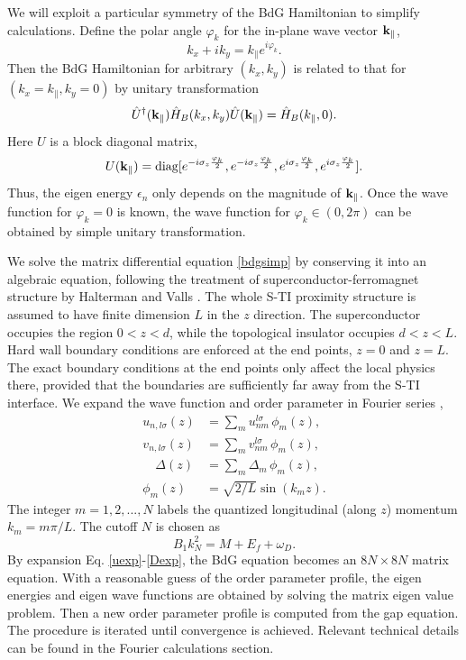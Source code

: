We will exploit a particular symmetry of the BdG Hamiltonian to simplify 
calculations. Define the polar angle $\varphi_k$ for the in-plane wave vector $\mathbf{k}_\parallel$, 
\begin{equation}
k_x+ik_y=k_{\parallel}e^{i\varphi_k}.
\end{equation}
Then the BdG Hamiltonian for arbitrary $(k_x,k_y)$ is
related to that for $(k_x=k_\parallel,k_y=0)$ by unitary transformation 
\begin{equation}
\hat{U}^\dagger(\mathbf{k}_\parallel) \hat{H}_{B}(k_x,k_y) \hat{U}(\mathbf{k}_\parallel) = \hat{H}_{B}(k_\parallel,0).
\label{symm}
\end{equation}
Here $U$ is a 
block diagonal matrix,
\begin{equation}
U(\mathbf{k}_\parallel)=\mathrm{diag}[e^{-i\sigma_z\frac{\varphi_k}{2}}, e^{-i\sigma_z\frac{\varphi_k}{2}}, e^{i\sigma_z\frac{\varphi_k}{2}},e^{i\sigma_z\frac{\varphi_k}{2}} ]. \label{unit}
\end{equation}
Thus, the eigen energy $\epsilon_n$ only depends on the magnitude of $\mathbf{k}_\parallel$.
Once the wave function for $\varphi_k=0$ is known, the wave function for $\varphi_k\in (0,2\pi)$
can be obtained by simple unitary transformation.

We solve the matrix differential equation \eqref{bdgsimp} by conserving it into an algebraic equation, 
following the treatment of superconductor-ferromagnet structure by 
Halterman and Valls \cite{h-v}. The whole S-TI proximity structure is assumed to have 
finite dimension $L$ in the $z$
direction. The superconductor occupies the region $0<z<d$,
while the topological insulator occupies $d<z<L$. Hard wall boundary conditions are enforced at the end points, 
$z=0$ and $z=L$.  
The exact boundary conditions at the end points only affect the local physics there, provided 
that the boundaries are sufficiently far away from the S-TI interface. We expand the wave function
and order parameter in Fourier series \cite{h-v},
\begin{align}
u_{n,l\sigma}(z) &= \sum_m u_{nm}^{l \sigma}\,\phi_m(z),\label{uexp}\\ 
v_{n,l\sigma}(z) &= \sum_m v_{nm}^{l \sigma}\, \phi_m(z),\\
\quad \Delta(z) &= \sum_m \Delta_{m}\, \phi_m(z) , \label{Dexp}\\
\phi_m(z)&=\sqrt{2/L}\sin(k_m z).
\end{align}
The integer $m=1,2,...,N$ labels the quantized longitudinal (along $z$) momentum $k_m=m\pi/L$. 
The cutoff $N$ is chosen as \cite{s-v}
\begin{equation}
B_1k^2_N=M+E_f+\omega_D. \label{eq-N}
\end{equation}
By expansion Eq. \eqref{uexp}-\eqref{Dexp}, the BdG equation
becomes an $8N \times 8N$ matrix equation. With a reasonable guess of the order parameter profile, 
the eigen energies and eigen wave functions are obtained by solving the matrix eigen value problem.
Then a new order parameter profile is computed from the gap equation. The procedure is iterated
until convergence is achieved.  Relevant technical details can be found
in the Fourier calculations section. 

